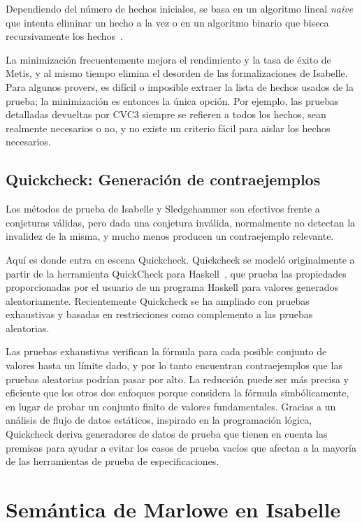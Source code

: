 \documentclass[12pt]{book}
\begin{document}
Dependiendo del número de hechos iniciales, se basa en un algoritmo lineal \textit{naive} que intenta eliminar un hecho a la vez o en un algoritmo binario que biseca recursivamente los hechos~\cite{sledgehammer_judgement_day}.

La minimización frecuentemente mejora el rendimiento y la tasa de éxito de Metis, y al mismo tiempo elimina el desorden de las formalizaciones de Isabelle. Para algunos provers, es difícil o imposible extraer la lista de hechos usados de la prueba; la minimización es entonces la única opción. Por ejemplo, las pruebas detalladas devueltas por CVC3 siempre se refieren a todos los hechos, sean realmente necesarios o no, y no existe un criterio fácil para aislar los hechos necesarios.

\subsection{Quickcheck: Generación de contraejemplos}

Los métodos de prueba de Isabelle y Sledgehammer son efectivos frente a conjeturas válidas, pero dada una conjetura inválida, normalmente no detectan la invalidez de la misma, y mucho menos producen un contraejemplo relevante.

Aquí es donde entra en escena Quickcheck. Quickcheck se modeló originalmente a partir de la herramienta QuickCheck para Haskell~\cite{quickcheck_haskell}, que prueba las propiedades proporcionadas por el usuario de un programa Haskell para valores generados aleatoriamente. Recientemente Quickcheck se ha ampliado con pruebas exhaustivas y basadas en restricciones como complemento a las pruebas aleatorias.

Las pruebas exhaustivas verifican la fórmula para cada posible conjunto de valores hasta un límite dado, y por lo tanto encuentran contraejemplos que las pruebas aleatorias podrían pasar por alto. La reducción puede ser más precisa y eficiente que los otros dos enfoques porque considera la fórmula simbólicamente, en lugar de probar un conjunto finito de valores fundamentales. Gracias a un análisis de flujo de datos estáticos, inspirado en la programación lógica, Quickcheck deriva generadores de datos de prueba que tienen en cuenta las premisas para ayudar a evitar los casos de prueba vacíos que afectan a la mayoría de las herramientas de prueba de especificaciones.


\section{Semántica de Marlowe en Isabelle}\label{sec:Semantica_marlowe_isabelle}
\end{document}
